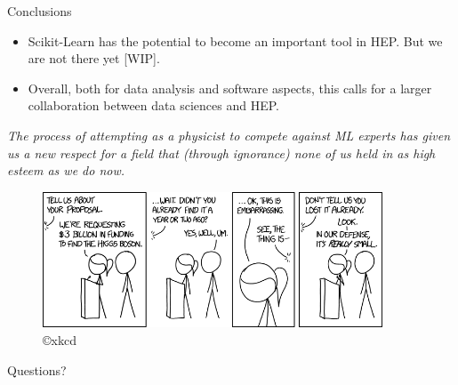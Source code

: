 \documentclass{beamer}
\begin{document}
\begin{frame}{Conclusions}

\begin{itemize}

\vspace{0.5cm}

\item Scikit-Learn has the potential to become an important tool in HEP. But we are not there yet [WIP].

\vspace{0.5cm}

\item Overall, both for data analysis and software aspects, this calls
  for a {\color{blue} larger collaboration between data sciences and HEP}.
\end{itemize}

\vspace{0.25cm}

\begin{center}
\it The process of attempting as a physicist to compete against ML experts
has given us a new respect for a field that (through ignorance) none of us held in as high esteem as we do now.
\end{center}

\end{frame}


\appendix

\begin{frame}

\begin{figure}
\includegraphics[width=0.9\textwidth]{./figures/xkcd.png}\\
{\hfill \scriptsize \copyright xkcd}
\end{figure}

\vspace{0.5cm}

\begin{center}
{\Huge  Questions?}
\end{center}
\end{frame}
\end{document}
